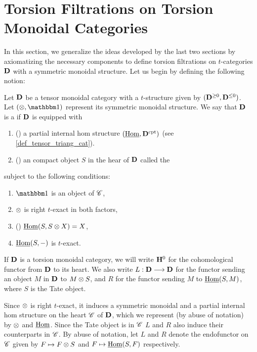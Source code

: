 \newpage
\chapter{Torsion Filtrations on Torsion Monoidal Categories}
\label{sect_filtration_general}

In this section, we generalize the ideas developed by the last
two sections by axiomatizing the necessary components to define
torsion filtrations on $t$-categories $\mathbf{D}$ with a symmetric
monoidal structure. Let us begin by defining the following notion:

\begin{defn}\label{def_torsion_monoidal_category}
Let $\mathbf{D}$ be a tensor monoidal category with a $t$-structure 
given by $(\mathbf{D}^{\geq 0}, \mathbf{D}^{\leq 0})$. Let 
$(\tensor, \Unit)$ represent its symmetric monoidal structure. We 
say that $\mathbf{D}$ is a  if $\mathbf{D}$ 
is equipped with 
\begin{enumerate}
\item () a partial internal hom
structure $(\underline{\mathrm{Hom}}, \mathbf{D}^{\mathrm{cpt}})$ (see 
\ref{def_tensor_triang_cat}).

\item () an compact object $S$ in the hear
   of $\mathbf{D}$ called the 
\end{enumerate}

\noindent subject to the following conditions:

\begin{enumerate}
\item $\Unit$ is an object of $\mathscr{C}$,

\item $\otimes$ is right $t$-exact in both factors,

\item () $\underline{\mathrm{Hom}}(S, S \otimes X) = X$,

\item $\underline{\mathrm{Hom}}(S, -)$ is $t$-exact.
\end{enumerate}
\end{defn}

If $\mathbf{D}$ is a torsion monoidal category, we will write $\mathbf{H}^0$
for the cohomological functor from $\mathbf{D}$ to its heart. We also 
write $L: \mathbf{D} \longrightarrow \mathbf{D}$ for the functor sending an object $M$ 
in $\mathbf{D}$ to $M \otimes S$, and $R$ for the functor sending $M$
to $\underline{\mathrm{Hom}}(S, M)$, where $S$ is the Tate object. 

Since $\otimes$ is right $t$-exact, it induces a symmetric 
monoidal and a partial internal hom structure on the heart 
$\mathscr{C}$ of $\mathbf{D}$, which we represent (by abuse of notation)
by $\otimes$ and $\underline{\mathrm{Hom}}$. Since the Tate object is in $\mathscr{C}$
$L$ and $R$ also induce their counterparts in $\mathscr{C}$. By
abuse of notation, let $L$ and $R$ denote the endofunctor on 
$\mathscr{C}$ given by $F \mapsto F \otimes S$ and $F \mapsto
\underline{\mathrm{Hom}}(S, F)$ respectively.

